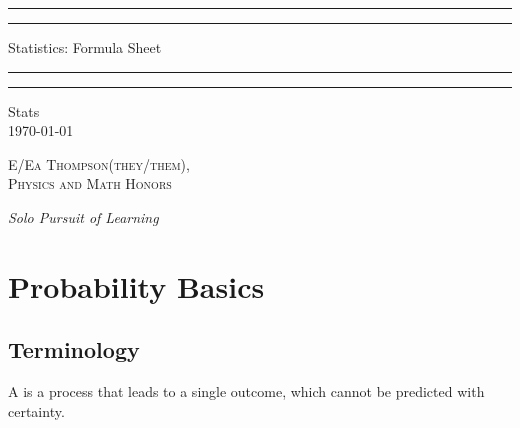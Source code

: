 \documentclass[12pt]{report}
\begin{document}


\begin{titlepage}
    \centering
    \scshape
    \vspace*{\baselineskip}
    \rule{\textwidth}{1.6pt}\vspace*{-\baselineskip}\vspace*{2pt}
    \rule{\textwidth}{0.4pt}
    
    \vspace{0.75\baselineskip}
    
    {\LARGE Statistics: Formula Sheet}
    
    \vspace{0.75\baselineskip}
    
    \rule{\textwidth}{0.4pt}\vspace*{-\baselineskip}\vspace{3.2pt}
    \rule{\textwidth}{1.6pt}
    
    \vspace{2\baselineskip}
    Stats \\
    \vspace*{3\baselineskip}
    \monthdayyeardate\today \\
    \vspace*{5.0\baselineskip}
    
    {\scshape\Large E/Ea Thompson(they/them), \\ Physics and Math Honors\\}
    
    \vspace{1.0\baselineskip}
    \textit{Solo Pursuit of Learning}
\end{titlepage}

\tableofcontents



\chapter{Probability Basics}

\section{Terminology}

\begin{defn}{}{}
    A  is a process that leads to a single outcome, which cannot be predicted with certainty.
\end{defn}
\end{document}
